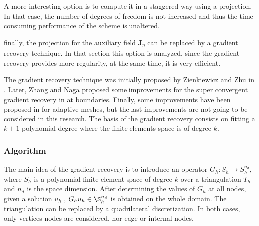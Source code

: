 A more interesting option is to compute it in a staggered way using a projection. In that case, the number of degrees of freedom is not increased and thus the time consuming performance of the scheme is unaltered. 

finally, the projection for the auxiliary field $\mathbf{J}_\eta$ can be replaced by a gradient recovery technique. In that section this option is analyzed, since the gradient recovery provides more regularity, at the same time, it is very efficient.

The gradient recovery technique was initially proposed by Zienkiewicz and Zhu in \cite{zienkiewicz1992}. Later, Zhang and Naga proposed some improvements for the super convergent gradient recovery in \cite{zhang2005} at boundaries. Finally, some improvements have been proposed in \cite{wu2007,ahmed2021} for adaptive meshes, but the last improvements are not going to be considered in this research. The basis of the gradient recovery consists on fitting a $k+1$ polynomial degree where the finite elements space is of degree $k$.


\subsubsection{Algorithm}

The main idea of the gradient recovery is to introduce an operator $G_h : S_h \rightarrow S_h^{n_d}$, where $S_h$ is a polynomial finite element space of degree $k$ over a triangulation $T_h$ and $n_d$ is the space dimension. After determining the values of $G_h$ at all nodes, given a solution $u_h$ , $G_h u_h \in \S_h^{n_d}$ is obtained on the whole domain.
The triangulation can be replaced by a quadrilateral discretization. In both cases, only vertices nodes are considered, nor edge or internal nodes.

